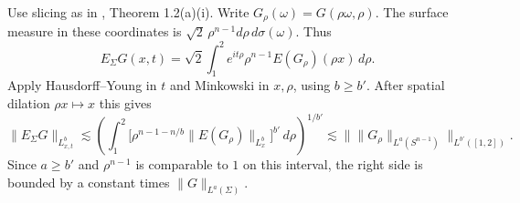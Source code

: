 Use slicing as in \cite{r-61}, Theorem 1.2(a)(i). Write \(G_\rho(\omega)=G(\rho\omega,\rho)\). The surface measure in these coordinates is \(\sqrt2\,\rho^{n-1}d\rho\,d\sigma(\omega)\). Thus
\[
 E_\Sigma G(x,t)=\sqrt2\int_1^2 e^{it\rho}\rho^{n-1}E(G_\rho)(\rho x)\,d\rho .
\]
Apply Hausdorff--Young in \(t\) and Minkowski in \(x,\rho\), using \(b\ge b'\). After spatial dilation \(\rho x\mapsto x\) this gives
\[
 \|E_\Sigma G\|_{L^b_{x,t}}\lesssim
 \left(\int_1^2\big[\rho^{n-1-n/b}\|E(G_\rho)\|_{L^b_x}\big]^{b'}\,d\rho\right)^{1/b'}
 \lesssim\big\|\|G_\rho\|_{L^a(S^{n-1})}\big\|_{L^{b'}([1,2])}.
\]
Since \(a\ge b'\) and \(\rho^{n-1}\) is comparable to \(1\) on this interval, the right side is bounded by a constant times \(\|G\|_{L^a(\Sigma)}\).
